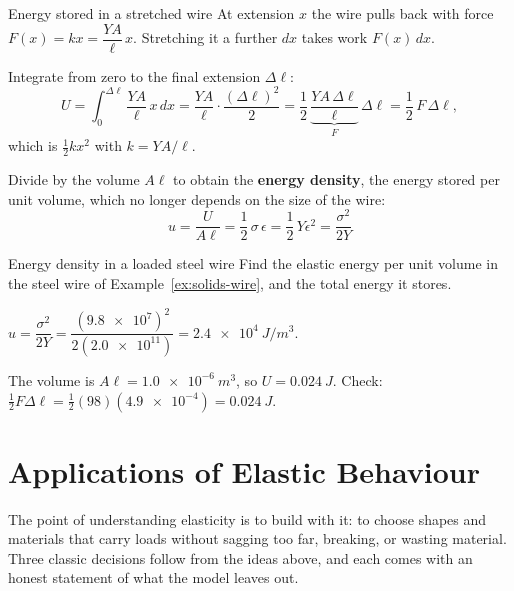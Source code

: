 \begin{derivbox}{Energy stored in a stretched wire}
 At extension $x$ the wire pulls back with force $F(x)=kx=\dfrac{YA}{\ell}\,x$. Stretching it a
further $dx$ takes work $F(x)\,dx$.

 Integrate from zero to the final extension $\Delta\ell$:
\[
U=\int_0^{\Delta\ell}\frac{YA}{\ell}\,x\,dx=\frac{YA}{\ell}\cdot\frac{(\Delta\ell)^{2}}{2}
=\frac12\,\underbrace{\frac{YA\,\Delta\ell}{\ell}}_{F}\,\Delta\ell=\frac12\,F\,\Delta\ell ,
\]
which is $\tfrac12kx^{2}$ with $k=YA/\ell$.

 Divide by the volume $A\ell$ to obtain the \textbf{energy density}, the energy stored per unit
volume, which no longer depends on the size of the wire:
\[
\boxed{\;u=\frac{U}{A\ell}=\frac12\,\sigma\,\epsilon=\frac12\,Y\epsilon^{2}=\frac{\sigma^{2}}{2Y}\;}
\]
\end{derivbox}


\begin{exbox}{Energy density in a loaded steel wire}\label{ex:solids-energy}
Find the elastic energy per unit volume in the steel wire of Example~\ref{ex:solids-wire}, and the total
energy it stores.

 $u=\dfrac{\sigma^{2}}{2Y}=\dfrac{(\num{9.8e7})^{2}}{2(\num{2.0e11})}=\SI{2.4e4}{J/m^3}$.

 The volume is $A\ell=\SI{1.0e-6}{m^3}$, so $U=\SI{0.024}{J}$. Check:
$\tfrac12F\Delta\ell=\tfrac12(98)(\num{4.9e-4})=\SI{0.024}{J}$.
\end{exbox}

\section{Applications of Elastic Behaviour}\label{sec:solids-apps}

The point of understanding elasticity is to build with it: to choose shapes and materials that carry
loads without sagging too far, breaking, or wasting material. Three classic decisions follow from the
ideas above, and each comes with an honest statement of what the model leaves out.

